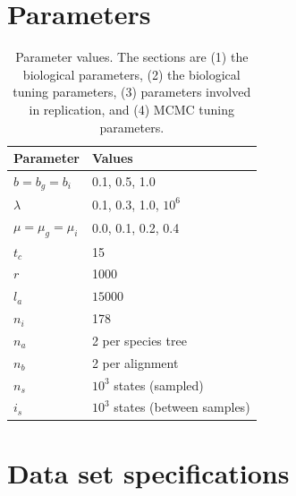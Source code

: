 \documentclass{article}
\begin{document}

\section{Parameters}

\begin{table}
  \centering 
  \begin{tabular}{l l}
    \hline
    Parameter             & Values \\
    \hline
    \hline
    $b = b_g = b_i$       & 0.1, 0.5, 1.0 \\
    $\lambda$             & 0.1, 0.3, 1.0, $10^6$ \\
    $\mu = \mu_g = \mu_i$ & 0.0, 0.1, 0.2, 0.4 \\
    \hline
    $t_c$                 & 15 \\
    $r$                   & 1000 \\
    $l_a$                 & $15000$ \\
    \hline
    $n_i$                 & 178 \\
    $n_a$                 & 2 per species tree\\
    $n_b$                 & 2 per alignment\\
    \hline
    $n_s$                 & $10^3$ states (sampled)\\
    $i_s$                 & $10^3$ states (between samples)\\
    \hline
  \end{tabular}
  \caption{
    Parameter values. The sections are (1) the biological parameters, (2) the
    biological tuning parameters, (3) parameters involved in replication, 
    and (4) MCMC tuning parameters.
  }
  \label{table:parameter_values}
\end{table}

\section{Data set specifications}
\end{document}
